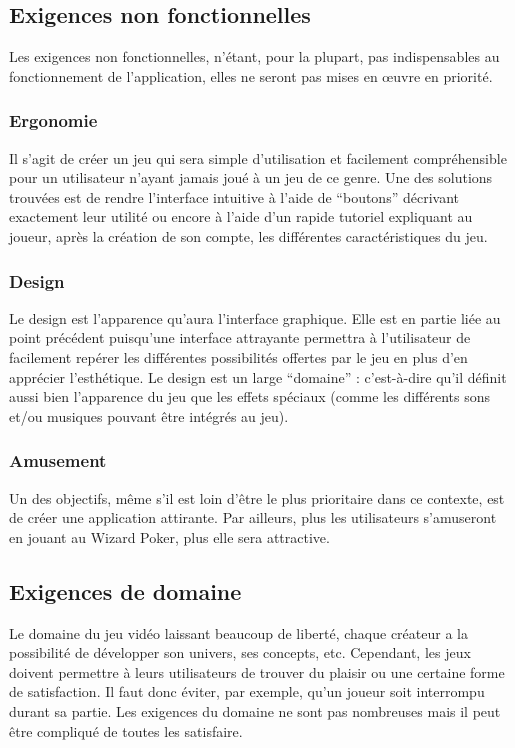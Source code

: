 \documentclass[11pt,a4paper]{article}
\begin{document}
\subsection{Exigences non fonctionnelles}
\label{sec:exi-nonfonc}

Les exigences non fonctionnelles, n'étant, pour la plupart, pas indispensables au fonctionnement de l'application, elles ne seront pas mises en œuvre en priorité.


\subsubsection*{Ergonomie}
Il s'agit de créer un jeu qui sera simple d'utilisation et facilement compréhensible pour un utilisateur n'ayant jamais joué à un jeu de ce genre.
\medbreak
Une des solutions trouvées est de rendre l'interface intuitive à l'aide de ``boutons'' décrivant exactement leur utilité ou encore à l'aide d'un rapide tutoriel expliquant au joueur, après la création de son compte, les différentes caractéristiques du jeu.


\subsubsection*{Design}
Le design est l'apparence qu'aura l'interface graphique. Elle est en partie liée au point précédent puisqu'une interface attrayante permettra à l'utilisateur de facilement repérer les différentes possibilités offertes par le jeu en plus d'en apprécier l'esthétique.
\medbreak
Le design est un large ``domaine'' : c'est-à-dire qu'il définit aussi bien l'apparence du jeu  que les effets spéciaux (comme les différents sons et/ou musiques pouvant être intégrés au jeu).


\subsubsection*{Amusement}
Un des objectifs, même s'il est loin d'être le plus prioritaire dans ce contexte, est de créer une application attirante. Par ailleurs, plus les utilisateurs s'amuseront en jouant au Wizard Poker, plus elle sera attractive.


\subsection{Exigences de domaine}
\label{sec:exi-dom}

Le domaine du jeu vidéo laissant beaucoup de liberté, chaque créateur a la possibilité de développer son univers, ses concepts, etc.  Cependant, les jeux doivent permettre à leurs utilisateurs de trouver du plaisir ou une certaine forme de satisfaction.  Il faut donc éviter, par exemple, qu'un joueur soit interrompu durant sa partie.  Les exigences du domaine ne sont pas nombreuses mais il peut être compliqué de toutes les satisfaire.
\end{document}
